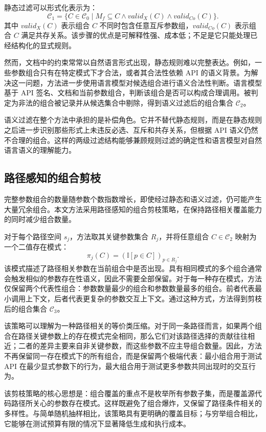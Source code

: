 \documentclass[UTF8,fontset=fandol]{ctexart}
\begin{document}
静态过滤可以形式化表示为：
\[
\mathcal{C}_1=\{C \in \mathcal{C}_0 \mid M_f \subseteq C \land valid_X(C) \land valid_{Co}(C)\}.
\]
其中 $valid_X(C)$ 表示组合 $C$ 不同时包含任意互斥参数组，$valid_{Co}(C)$ 表示组合 $C$ 满足共存关系。该步骤的优点是可解释性强、成本低；不足是它只能处理已经结构化的显式规则。

然而，文档中的约束常常以自然语言形式出现，静态规则难以完整表达。例如，一些参数组合只有在特定模式下才合法，或者其合法性依赖 API 的语义背景。为解决这一问题，方法进一步使用语言模型对候选组合进行语义合法性判断。语言模型基于 API 签名、文档和当前参数组合，判断该组合是否可以构成合理调用。被判定为非法的组合被记录并从候选集合中剔除，得到语义过滤后的组合集合 $\mathcal{C}_2$。

语义过滤在整个方法中承担的是补偿角色。它并不替代静态规则，而是在静态规则之后进一步识别那些形式上未违反必选、互斥和共存关系，但根据 API 语义仍然不合理的组合。这样的两级过滤结构能够兼顾规则过滤的确定性和语言模型对自然语言语义的理解能力。

\subsection{路径感知的组合剪枝}

完整参数组合的数量随参数个数指数增长，即使经过静态和语义过滤，仍可能产生大量冗余组合。本文方法采用路径感知的组合剪枝策略，在保持路径相关覆盖能力的同时减少组合数量。

对于每个路径空间 $s_j$，方法取其关键参数集合 $R_j$，并将任意组合 $C \in \mathcal{C}_2$ 映射为一个二值存在模式：
\[
\pi_j(C)=\left(\mathbb{I}[p \in C]\right)_{p \in R_j}.
\]
该模式描述了路径相关参数在当前组合中是否出现。具有相同模式的多个组合通常会触发相似的参数存在性语义，因此不需要全部保留。对于每一种存在模式，方法仅保留两个代表性组合：参数数量最少的组合和参数数量最多的组合。前者代表最小调用上下文，后者代表更复杂的参数交互上下文。通过这种方式，方法得到剪枝后的组合集合 $\mathcal{C}_3$。

该策略可以理解为一种路径相关的等价类压缩。对于同一条路径而言，如果两个组合在路径关键参数上的存在模式完全相同，那么它们对该路径选择的贡献往往相近；二者的差异主要来自非关键参数，而这些参数不应主导组合数量。因此，方法不再保留同一存在模式下的所有组合，而是保留两个极端代表：最小组合用于测试 API 在最少显式参数下的行为，最大组合用于测试更多参数共同出现时的交互行为。

该剪枝策略的核心思想是：组合覆盖的重点不是枚举所有参数子集，而是覆盖源代码路径所关心的参数存在模式。这样既避免了组合爆炸，又保留了路径条件相关的多样性。与简单随机抽样相比，该策略具有更明确的覆盖目标；与穷举组合相比，它能够在测试预算有限的情况下显著降低生成和执行成本。
\end{document}
